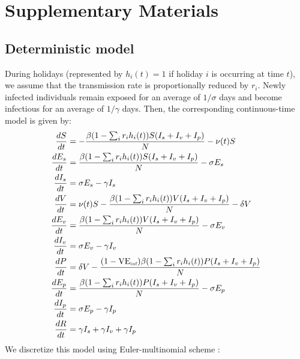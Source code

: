 \documentclass[12pt]{article}
\begin{document}
\section*{Supplementary Materials}

\subsection*{Deterministic model}

During holidays (represented by $h_i(t) = 1$ if holiday $i$ is occurring at time $t$), we assume that the transmission rate is proportionally reduced by $r_i$. 
Newly infected individuals remain exposed for an average of $1/\sigma$ days and become infectious for an average of $1/\gamma$ days.
Then, the corresponding continuous-time model is given by:
  \begin{align}
  \frac{dS}{dt} &= - \frac{\beta (1 - \sum_i r_i h_i(t)) S (I_s + I_v + I_p)}{N} - \nu(t) S\\
  \frac{dE_s}{dt} &= \frac{\beta (1 - \sum_i r_i h_i(t)) S (I_s + I_v + I_p)}{N} - \sigma E_s\\
  \frac{dI_s}{dt} &= \sigma E_s - \gamma I_s\\
  \frac{dV}{dt} &= \nu(t) S - \frac{\beta (1 - \sum_i r_i h_i(t)) V (I_s + I_v + I_p)}{N} - \delta V\\
  \frac{dE_v}{dt} &= \frac{\beta (1 - \sum_i r_i h_i(t)) V (I_s + I_v + I_p)}{N} - \sigma E_v\\
  \frac{dI_v}{dt} &= \sigma E_v - \gamma I_v\\
  \frac{dP}{dt} &= \delta V - \frac{(1-\mathrm{VE}_{\textrm{\tiny{inf}}})\beta (1 - \sum_i r_i h_i(t)) P (I_s + I_v + I_p)}{N}\\
  \frac{dE_p}{dt} &= \frac{\beta (1 - \sum_i r_i h_i(t)) P (I_s + I_v + I_p)}{N} - \sigma E_p\\
  \frac{dI_p}{dt} &= \sigma E_p - \gamma I_p\\
  \frac{dR}{dt} &= \gamma I_s + \gamma I_v + \gamma I_p\\
  \end{align}
We discretize this model using Euler-multinomial scheme \citep{he2010plug}:
\end{document}
